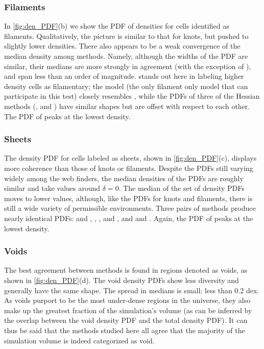 \subsubsection{Filaments} 
In \autoref{fig:den_PDF}(b) we show the PDF of densities for cells identified as filaments. Qualitatively, the picture is similar to that for knots, but pushed to slightly lower densities. There also appears to be a weak convergence of the median density among methods. Namely, although the widths of the PDF are similar, their medians are more strongly in agreement (with the exception of \mswa{}), and span less than an order of magnitude. \mswa{} stands out here in labeling higher density cells as filamentary; the \bisous{} model (the only filament only model that can participate in this test) closely resembles \origami{}, while the PDFs of three of the Hessian methods (\tweb{}, \vweb{} and \classic{}) have similar shapes but are offset with respect to each other. The PDF of \spine{} peaks at the lowest density.

\subsubsection{Sheets}
The density PDF for cells labeled as sheets, shown in \autoref{fig:den_PDF}(c), displays more coherence  than those of knots or filaments. Despite the PDFs still varying widely among the web finders, the median densities of the PDFs are roughly similar and take values around $\delta=0$.
The median of the set of density PDFs moves to lower values, although, like the PDFs for knots and filaments, there is still a wide variety of permissible environments. Three pairs of methods produce nearly identical PDFs: \nexus{} and \origami{}, \disperse{}, \tweb{}, and \mmft{}, and \vweb{} and \classic{}. Again, the PDF of \spine{} peaks at the lowest density.

\subsubsection{Voids}
The best agreement between methods is found in regions denoted as voids, as shown in \autoref{fig:den_PDF}(d). The void density PDFs show less diversity and generally have the same shape. The spread in medians is small: less than 0.2 dex. As voids purport to be the most under-dense regions in the universe, they also make up the greatest fraction of the simulation's volume (as can be inferred by the overlap between the void density PDF and the total density PDF). It can thus be said that the methods studied here all agree that the majority of the simulation volume is indeed categorized as void.


